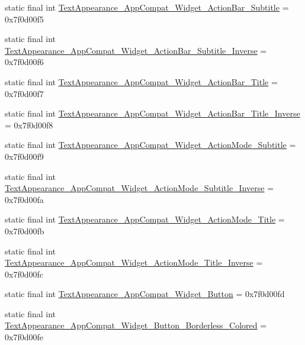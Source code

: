 \begin{DoxyCompactItemize}
\item 
static final int \mbox{\hyperlink{classandroid_1_1support_1_1design_1_1R_1_1style_a3a033a71413fc909da5a3688e40ae1d5}{Text\+Appearance\+\_\+\+App\+Compat\+\_\+\+Widget\+\_\+\+Action\+Bar\+\_\+\+Subtitle}} = 0x7f0d00f5
\item 
static final int \mbox{\hyperlink{classandroid_1_1support_1_1design_1_1R_1_1style_aa4ba43c3f0e2503bca1b293e5f7fa921}{Text\+Appearance\+\_\+\+App\+Compat\+\_\+\+Widget\+\_\+\+Action\+Bar\+\_\+\+Subtitle\+\_\+\+Inverse}} = 0x7f0d00f6
\item 
static final int \mbox{\hyperlink{classandroid_1_1support_1_1design_1_1R_1_1style_aaaab7e3d3971a6f10bb562b456a880ce}{Text\+Appearance\+\_\+\+App\+Compat\+\_\+\+Widget\+\_\+\+Action\+Bar\+\_\+\+Title}} = 0x7f0d00f7
\item 
static final int \mbox{\hyperlink{classandroid_1_1support_1_1design_1_1R_1_1style_a2722bf365f89efd965c2db9d167ded91}{Text\+Appearance\+\_\+\+App\+Compat\+\_\+\+Widget\+\_\+\+Action\+Bar\+\_\+\+Title\+\_\+\+Inverse}} = 0x7f0d00f8
\item 
static final int \mbox{\hyperlink{classandroid_1_1support_1_1design_1_1R_1_1style_a88f869ee4fba3220eafc9e864ca53331}{Text\+Appearance\+\_\+\+App\+Compat\+\_\+\+Widget\+\_\+\+Action\+Mode\+\_\+\+Subtitle}} = 0x7f0d00f9
\item 
static final int \mbox{\hyperlink{classandroid_1_1support_1_1design_1_1R_1_1style_a327b34a8b3d0970314966a1afc1fbad0}{Text\+Appearance\+\_\+\+App\+Compat\+\_\+\+Widget\+\_\+\+Action\+Mode\+\_\+\+Subtitle\+\_\+\+Inverse}} = 0x7f0d00fa
\item 
static final int \mbox{\hyperlink{classandroid_1_1support_1_1design_1_1R_1_1style_a76c4a04f6f0f71fecc0e75b34c0aa6a0}{Text\+Appearance\+\_\+\+App\+Compat\+\_\+\+Widget\+\_\+\+Action\+Mode\+\_\+\+Title}} = 0x7f0d00fb
\item 
static final int \mbox{\hyperlink{classandroid_1_1support_1_1design_1_1R_1_1style_aad2554eae3444b77e7be2d9754c380f8}{Text\+Appearance\+\_\+\+App\+Compat\+\_\+\+Widget\+\_\+\+Action\+Mode\+\_\+\+Title\+\_\+\+Inverse}} = 0x7f0d00fc
\item 
static final int \mbox{\hyperlink{classandroid_1_1support_1_1design_1_1R_1_1style_a5af41ce514978fd38404e848b723b5ae}{Text\+Appearance\+\_\+\+App\+Compat\+\_\+\+Widget\+\_\+\+Button}} = 0x7f0d00fd
\item 
static final int \mbox{\hyperlink{classandroid_1_1support_1_1design_1_1R_1_1style_a7fbd0962654b7e24b60836a045beb67b}{Text\+Appearance\+\_\+\+App\+Compat\+\_\+\+Widget\+\_\+\+Button\+\_\+\+Borderless\+\_\+\+Colored}} = 0x7f0d00fe

\end{DoxyCompactItemize}
